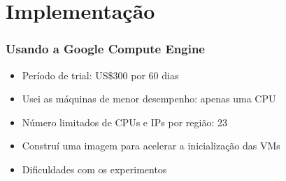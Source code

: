 \documentclass[10pt, compress]{beamer}
\begin{document}
\section{Implementação}

\begin{frame}[fragile]
  \frametitle{Usando a Google Compute Engine}
  \begin{itemize}
      \item Período de \alert{trial}: US\$300 por 60 dias 
      \item Usei as máquinas de \alert{menor desempenho}: apenas uma CPU
      \item Número limitados de \alert{CPUs} e \alert{IPs} por região: 23
      \item Construí uma \alert{imagem} para \alert{acelerar a inicialização} das VMs
      \item \alert{Dificuldades} com os experimentos
  \end{itemize}
\end{frame}
\end{document}
